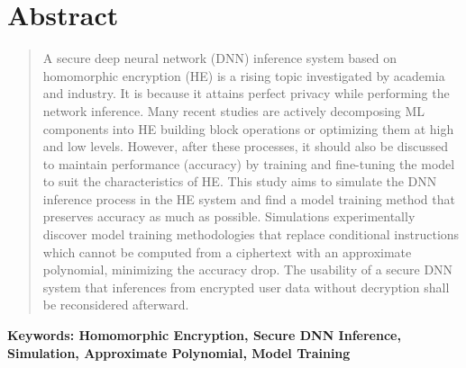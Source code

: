 \documentclass[a4paper, 11pt, chapterprefix=false]{report}
\begin{document}
\chapter*{Abstract}
\begin{quote}
A secure deep neural network (DNN) inference system based on homomorphic
encryption (HE) is a rising topic investigated by academia and industry. It is
because it attains perfect privacy while performing the network inference. Many
recent studies are actively decomposing ML components into HE building block
operations or optimizing them at high and low levels. However, after these
processes, it should also be discussed to maintain performance (accuracy) by
training and fine-tuning the model to suit the characteristics of HE. This study
aims to simulate the DNN inference process in the HE system and find a model
training method that preserves accuracy as much as possible. Simulations
experimentally discover model training methodologies that replace conditional
instructions which cannot be computed from a ciphertext with an approximate
polynomial, minimizing the accuracy drop. The usability of a secure DNN system
that inferences from encrypted user data without decryption shall be
reconsidered afterward.
\end{quote}

\begin{center}
  \textbf{Keywords: Homomorphic Encryption, Secure DNN Inference,\\
  Simulation, Approximate Polynomial, Model Training}
\end{center}
\end{document}
